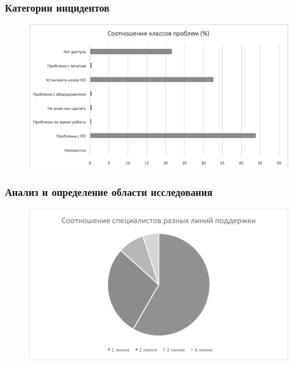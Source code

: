 \documentclass[14pt]{beamer}
\begin{document}
\begin{frame}
\frametitle{Категории инцидентов}
\begin{figure} [h] 
  \center
  \includegraphics [scale=0.6] {EngineerTasks}
  \label{img:EngineerTasks}  
\end{figure}
\end{frame}

\begin{frame}
\frametitle{Анализ и определение области исследования}
\begin{figure} [h] 
  \center
  \includegraphics [scale=0.7] {ITSMTeamComposition}
  \label{img:ITSMTeamComposition}  
\end{figure}

\end{frame}
\end{document}
